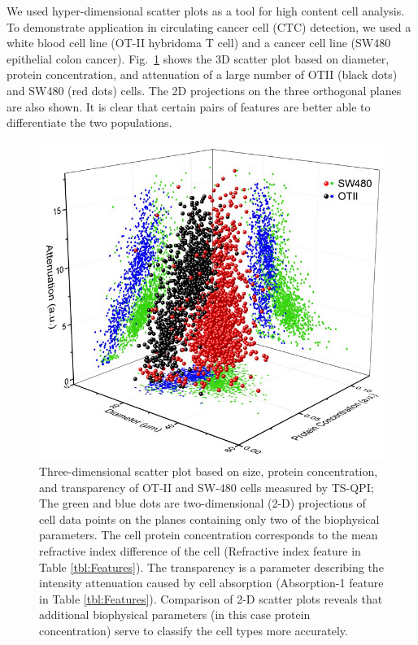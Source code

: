 \documentclass[aps,pra,reprint,superscriptaddress]{revtex4-1}
\begin{document}

We used hyper-dimensional scatter plots as a tool for high content cell analysis. To demonstrate application in circulating cancer cell (CTC) detection, we used a white blood cell line (OT-II hybridoma T cell) and a cancer cell line (SW480 epithelial colon cancer). Fig.~\ref{fig:OTSWScatter} shows the 3D scatter plot based on diameter, protein concentration, and attenuation of a large number of OTII (black dots) and SW480 (red dots) cells. The 2D projections on the three orthogonal planes are also shown. It is clear that certain pairs of features are better able to differentiate the two populations.

\begin{figure}
\includegraphics[scale=0.6]{FigureOTSWScatter.jpg}
\caption{\label{fig:OTSWScatter} Three-dimensional scatter plot based on size, protein concentration, and transparency of OT-II and SW-480 cells measured by TS-QPI; The green and blue dots are two-dimensional (2-D) projections of cell data points on the planes containing only two of the biophysical parameters. The cell protein concentration corresponds to the mean refractive index difference of the cell (Refractive index feature in Table \ref{tbl:Features}). The transparency is a parameter describing the intensity attenuation caused by cell absorption (Absorption-1 feature in Table \ref{tbl:Features}). Comparison of 2-D scatter plots reveals that additional biophysical parameters (in this case protein concentration) serve to classify the cell types more accurately.}
\end{figure}
\end{document}
